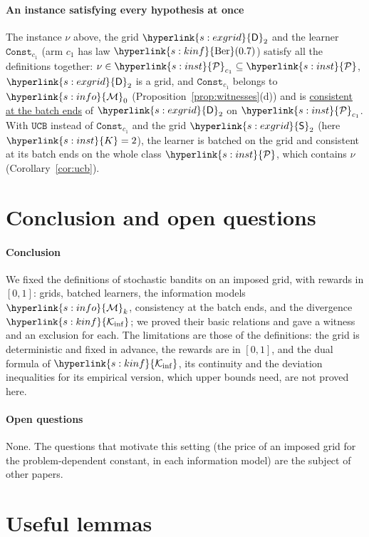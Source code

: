 \documentclass[11pt]{article}
\newcommand{\sy}[2]{{\hyperlink{#1}{#2}}}
\newcommand{\term}[2]{\hyperlink{#1}{#2}}
\newcommand{\1}{\mathbf{1}}
\newcommand{\Kar}{\sy{s:inst}{K}}
\newcommand{\cP}{\sy{s:inst}{\mathcal P}}
\newcommand{\Ber}{\sy{s:kinf}{\mathrm{Ber}}}
\newcommand{\Ki}{\sy{s:kinf}{\mathcal K_{\inf}}}
\newcommand{\Sq}{\sy{s:exgrid}{\mathsf S}}
\newcommand{\Db}{\sy{s:exgrid}{\mathsf D}}
\newcommand{\Mk}[1]{\sy{s:info}{\mathcal M}_{#1}}
\newcommand{\Const}{\hyperref[def:exlearners]{\texttt{Const}}}
\newcommand{\UCB}{\hyperref[def:exlearners]{\texttt{UCB}}}
\newcommand{\consistent}{\term{t:cons}{consistent at the batch ends}}
\begin{document}
\paragraph{An instance satisfying every hypothesis at once} The instance $\nu$ above, the grid
$\Db_2$ and the learner $\Const_{c_1}$ (arm $c_1$ has law $\Ber(0.7)$) satisfy all the definitions
together: $\nu\in\cP_{c_1}\subseteq\cP$, $\Db_2$ is a grid, and $\Const_{c_1}$ belongs to $\Mk{0}$
(Proposition~\ref{prop:witnesses}(d)) and is \consistent{} of $\Db_2$ on $\cP_{c_1}$. With
$\UCB$ instead of $\Const_{c_1}$ and the grid $\Sq_2$ (here $\Kar=2$), the learner is batched on
the grid and consistent at its batch ends on the whole class $\cP$, which contains $\nu$
(Corollary~\ref{cor:ucb}).

\section{Conclusion and open questions}\label{sec:open}

\paragraph{Conclusion} We fixed the definitions of stochastic bandits on an imposed grid, with rewards in $[0,1]$: grids,
batched learners, the information models $\Mk{k}$, consistency at the batch ends, and the divergence
$\Ki$; we proved their basic relations and gave a witness and an exclusion for each. The limitations
are those of the definitions: the grid is deterministic and fixed in advance, the rewards are in
$[0,1]$, and the dual formula of $\Ki$, its continuity and the deviation inequalities for its
empirical version, which upper bounds need, are not proved here.

\paragraph{Open questions} None. The questions that motivate this setting (the price of an imposed grid for
the problem-dependent constant, in each information model) are the subject of other papers.

\appendix

\section{Useful lemmas}\label{sec:cited}
\end{document}
